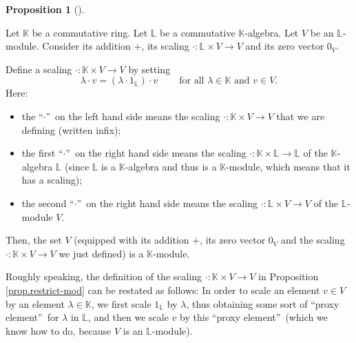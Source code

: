 \documentclass[numbers=enddot,12pt,final,onecolumn,notitlepage]{scrartcl}%
\theoremstyle{definition}
\newtheorem{prop}[theo]{Proposition}
\newenvironment{proposition}[1][]
{\begin{prop}[#1]\begin{leftbar}}
{\end{leftbar}\end{prop}}
\begin{document}
\begin{proposition}
\label{prop.restrict-mod}Let $\mathbb{K}$ be a commutative ring. Let
$\mathbb{L}$ be a commutative $\mathbb{K}$-algebra. Let $V$ be an $\mathbb{L}%
$-module. Consider its addition $+$, its scaling $\cdot:\mathbb{L}\times
V\rightarrow V$ and its zero vector $0_{V}$.

Define a scaling $\cdot:\mathbb{K}\times V\rightarrow V$ by setting%
\begin{equation}
\lambda\cdot v=\left(  \lambda\cdot1_{\mathbb{L}}\right)  \cdot
v\ \ \ \ \ \ \ \ \ \ \text{for all }\lambda\in\mathbb{K}\text{ and }v\in V.
\label{eq.prop.restrict-mod.fml}%
\end{equation}
Here:

\begin{itemize}
\item the \textquotedblleft$\cdot$\textquotedblright\ on the left hand side
means the scaling $\cdot:\mathbb{K}\times V\rightarrow V$ that we are defining
(written infix);

\item the first \textquotedblleft$\cdot$\textquotedblright\ on the right hand
side means the scaling $\cdot:\mathbb{K}\times\mathbb{L}\rightarrow\mathbb{L}$
of the $\mathbb{K}$-algebra $\mathbb{L}$ (since $\mathbb{L}$ is a $\mathbb{K}%
$-algebra and thus is a $\mathbb{K}$-module, which means that it has a scaling);

\item the second \textquotedblleft$\cdot$\textquotedblright\ on the right hand
side means the scaling $\cdot:\mathbb{L}\times V\rightarrow V$ of the
$\mathbb{L}$-module $V$.
\end{itemize}

Then, the set $V$ (equipped with its addition $+$, its zero vector $0_{V}$ and
the scaling $\cdot:\mathbb{K}\times V\rightarrow V$ we just defined) is a
$\mathbb{K}$-module.
\end{proposition}

Roughly speaking, the definition of the scaling $\cdot:\mathbb{K}\times
V\rightarrow V$ in Proposition \ref{prop.restrict-mod} can be restated as
follows: In order to scale an element $v\in V$ by an element $\lambda
\in\mathbb{K}$, we first scale $1_{\mathbb{L}}$ by $\lambda$, thus obtaining
some sort of \textquotedblleft proxy element\textquotedblright\ for $\lambda$
in $\mathbb{L}$, and then we scale $v$ by this \textquotedblleft proxy
element\textquotedblright\ (which we know how to do, because $V$ is an
$\mathbb{L}$-module).
\end{document}
